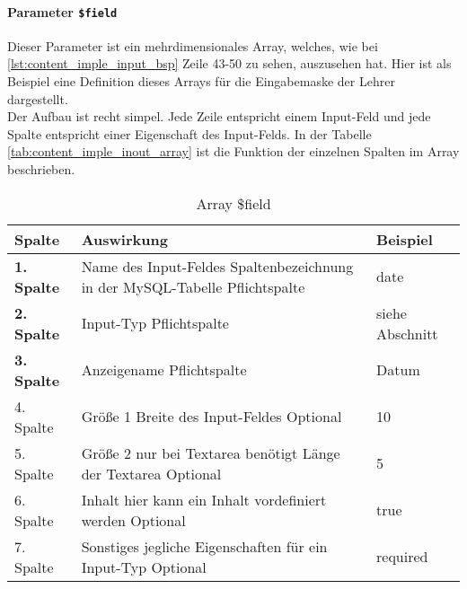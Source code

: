\paragraph{Parameter \texttt{\$field}\\}
Dieser Parameter ist ein mehrdimensionales Array, welches, wie bei \autoref{lst:content_imple_input_bsp} Zeile 43-50 zu sehen, auszusehen hat. Hier ist als Beispiel eine Definition dieses Arrays für die Eingabemaske der Lehrer dargestellt.\\
Der Aufbau ist recht simpel. Jede Zeile entspricht einem Input-Feld und jede Spalte entspricht einer Eigenschaft des Input-Felds. In der Tabelle \autoref{tab:content_imple_inout_array} ist die Funktion der einzelnen Spalten im Array beschrieben.
\begin{table}[H]
\centering
\begin{tabular}{p{2 cm}p{8 cm}p{3 cm}}
   \toprule
   \textbf{Spalte} & \textbf{Auswirkung} & \textbf{Beispiel} \\
   \midrule
          \textbf{1. Spalte} & Name des Input-Feldes \newline Spaltenbezeichnung in der MySQL-Tabelle \newline Pflichtspalte & date  \\
          \hline
          \textbf{2. Spalte} & Input-Typ \newline Pflichtspalte & siehe Abschnitt \nameref{sec:content_imple_input_type} \\
          \hline
          \textbf{3. Spalte} & Anzeigename \newline Pflichtspalte & Datum \\
          \hline
          4. Spalte & Größe 1 \newline Breite des Input-Feldes \newline Optional & 10\\
          \hline
          5. Spalte & Größe 2 \newline nur bei Textarea benötigt \newline Länge der Textarea \newline Optional & 5\\
          \hline
          6. Spalte & Inhalt \newline hier kann ein Inhalt vordefiniert werden  \newline Optional & true\\
          \hline
          7. Spalte & Sonstiges \newline jegliche Eigenschaften für ein Input-Typ \newline Optional & required \\
   \bottomrule
\end{tabular}
\caption{Array \$field}
\label{tab:content_imple_inout_array}
\end{table}
